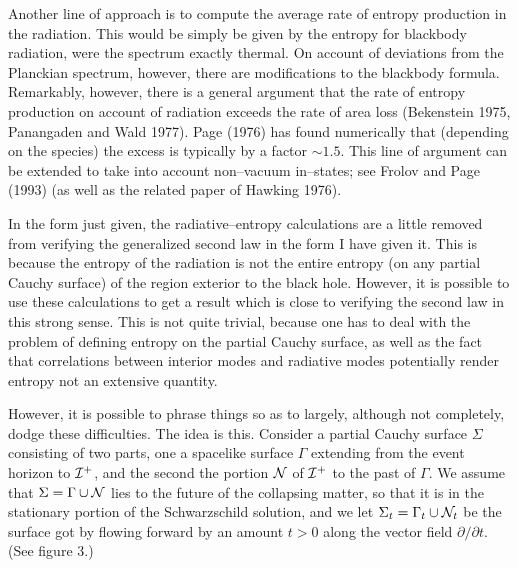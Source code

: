 Another line of approach is to compute the average rate of entropy production
in the radiation.  This would be simply be given by the entropy for blackbody
radiation, were the spectrum exactly thermal. On account of deviations from the
Planckian spectrum, however, there are modifications to the blackbody formula. 
Remarkably, however, there is a general argument that the rate of entropy
production on account of radiation exceeds the rate of area loss (Bekenstein
1975, Panangaden and Wald 1977).  Page (1976)  has found numerically that
(depending on the species) the excess is typically by a factor $\sim 1.5$. 
This line of argument can be extended to take into account non--vacuum
in--states; see Frolov and Page (1993) (as well as the related paper of Hawking
1976).

In the form just given, the radiative--entropy calculations are a little
removed from verifying the generalized second law in the form I have given it. 
This is because the entropy of the radiation is not the entire entropy (on any
partial Cauchy surface) of the region exterior to the black hole. However, it
is possible to use these calculations to get a result which is close to
verifying the second law in this strong sense. This is not quite trivial,
because one has to deal with the problem of defining entropy on the partial
Cauchy surface, as well as the fact that correlations between interior modes
and radiative modes potentially render entropy not an extensive quantity.

However, it is possible to phrase things so as to largely, although not
completely, dodge these difficulties.  The idea is this.  Consider a partial
Cauchy surface $\Sigma$ consisting of two parts, one a spacelike surface
$\Gamma$ extending from the event horizon to ${\cal I} ^+$, and the second the
portion ${\cal N}$ of ${\cal I} ^+$ to the past of $\Gamma$.  We assume that
$\Sigma =\Gamma \cup {\cal N}$ lies to the future of the collapsing matter, so
that it is in the stationary portion of the Schwarzschild solution, and we let
$\Sigma _t =\Gamma _t\cup {\cal N}_t$ be the surface got by flowing forward by
an amount $t>0$ along the vector field $\partial /\partial t$.  (See figure 3.)

\bigskip\bigskip
\epsfysize=3in
\centerline{}
\medskip
{}
\bigskip

